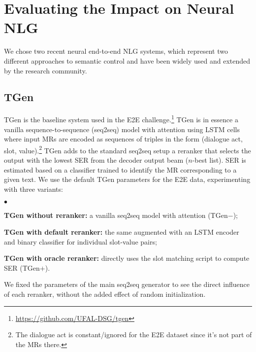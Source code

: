 \documentclass[11pt,a4paper]{article}
\newcommand{\squishlist}{
 \begin{list}{$\bullet$}
  { \setlength{\itemsep}{0pt}
     \setlength{\parsep}{2pt}
     \setlength{\topsep}{2pt}
     \setlength{\partopsep}{0pt}
     \setlength{\leftmargin}{1em}
     \setlength{\labelwidth}{1em}
     \setlength{\labelsep}{0.4em} } }
\newcommand{\squishend}{
  \end{list}  }
\begin{document}
\section{Evaluating the Impact on Neural NLG}
\label{sec:evaluating-impact}

We chose two recent neural end-to-end NLG systems, which represent two
different approaches to semantic control and have been widely used and extended by the research community.  

\subsection{TGen}
\label{sec:tgen}

TGen \cite{Dusek:ACL16} is the baseline system used in the E2E challenge.\footnote{\url{https://github.com/UFAL-DSG/tgen}} TGen is in essence a vanilla sequence-to-sequence (seq2seq) model with attention \cite{bahdanau_neural_2015} using LSTM cells where input MRs are encoded as sequences of triples in the form (dialogue act, slot, value).\footnote{The dialogue act is constant/ignored for the E2E dataset since it's not part of the MRs there.} TGen adds to the standard seq2seq setup a reranker that selects the output with the lowest SER from the decoder output beam ($n$-best list). SER is estimated based on a classifier trained to identify the MR corresponding to a given text.
We use the default TGen parameters for the E2E data, experimenting with three variants:
\squishlist
\item \textbf{TGen without reranker:} a vanilla seq2seq model with attention (TGen$-$);
\item \textbf{TGen with default reranker:} the same augmented with an LSTM encoder and binary classifier for individual slot-value pairs;
\item \textbf{TGen with oracle reranker:} directly uses the slot matching script to compute SER (TGen$+$).
\squishend
We fixed the parameters of the main seq2seq generator to see the direct influence of each reranker, without the added effect of random initialization.
\end{document}
